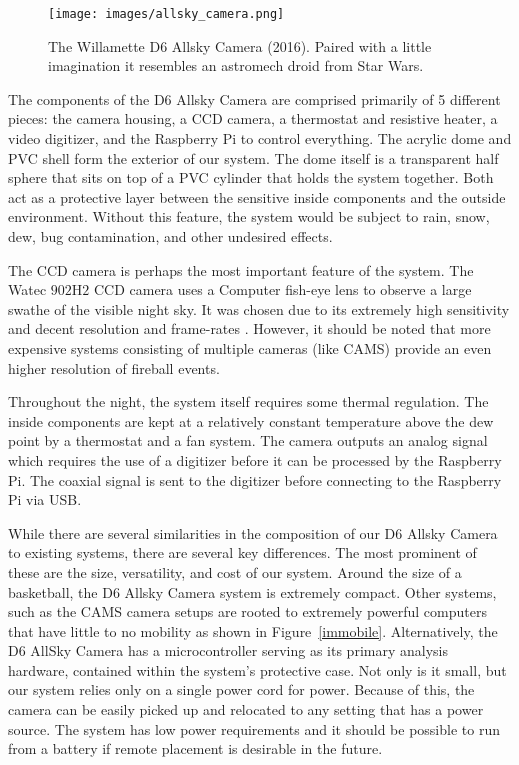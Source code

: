 \begin{figure}[ht!]
  \centering
  \texttt{[image: images/allsky\_camera.png]}
  \caption{The Willamette D6 Allsky Camera (2016). Paired with a little imagination it resembles an astromech droid from Star Wars.}
  \label{droid}
\end{figure}


The components of the D6 Allsky Camera are comprised primarily of 5 different pieces: the camera housing, a CCD camera, a thermostat and resistive heater, a video digitizer, and the Raspberry Pi to control everything.
The acrylic dome and PVC shell form the exterior of our system. 
The dome itself is a transparent half sphere that sits on top of a PVC cylinder that holds the system together.
Both act as a protective layer between the sensitive inside components and the outside environment.  
Without this feature, the system would be subject to rain, snow, dew, bug contamination, and other undesired effects.

The CCD camera is perhaps the most important feature of the system.
The Watec $902$H$2$ CCD camera uses a Computer fish-eye lens to observe a large swathe of the visible night sky.
It was chosen due to its extremely high sensitivity and decent resolution and frame-rates \cite{noauthor_wat-902h2_nodate}.
However, it should be noted that more expensive systems consisting of multiple cameras (like CAMS) provide an even higher resolution of fireball events.

Throughout the night, the system itself requires some thermal regulation.
The inside components are kept at a relatively constant temperature above the dew point by a thermostat and a fan system.
The camera outputs an analog signal which requires the use of a digitizer before it can be processed by the Raspberry Pi.
The coaxial signal is sent to the digitizer before connecting to the Raspberry Pi via USB.

While there are several similarities in the composition of our D6 Allsky Camera to existing systems, there are several key differences.
The most prominent of these are the size, versatility, and cost of our system.
Around the size of a basketball, the D6 Allsky Camera system is extremely compact.
Other systems, such as the CAMS camera setups are rooted to extremely powerful computers that have little to no mobility as shown in Figure~\ref{immobile}.
Alternatively, the D6 AllSky Camera has a microcontroller serving as its primary analysis hardware, contained within the system's protective case.
Not only is it small, but our system relies only on a single power cord for power.  
Because of this, the camera can be easily picked up and relocated to any setting that has a power source.  
The system has low power requirements and it should be possible to run from a battery if remote placement is desirable in the future.


